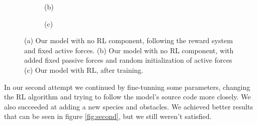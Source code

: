 \documentclass[9pt]{pnas-new}
\begin{document}
\begin{figure}[ht]
\begin{subfigure}{0.30\textwidth}
			\vspace{0.5em}
			\centering (b)
		\end{subfigure}
		\hfill
		\begin{subfigure}{0.30\textwidth}
			\centering
			\vspace{0.5em}
			\centering (c)
		\end{subfigure}
		
		\caption{(a) Our model with no RL component, following the reward system and fixed active forces. (b) Our model with no RL component, with added fixed passive forces and random initialization of active forces (c) Our model with RL, after training.}
		\label{fig:three_images}
	\end{figure}
	
	In our second attempt we continued by fine-tunning some parameters, changing the RL algorithm and trying to follow the model's source code more closely. We also succeeded at adding a new species and obstacles. We achieved better results that can be seen in figure \ref{fig:second}, but we still weren't satisfied.
	
\end{document}
